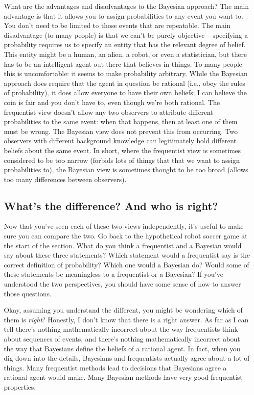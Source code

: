 \documentclass[
]{book}
\begin{document}
What are the advantages and disadvantages to the Bayesian approach? The main advantage is that it allows you to assign probabilities to any event you want to. You don't need to be limited to those events that are repeatable. The main disadvantage (to many people) is that we can't be purely objective -- specifying a probability requires us to specify an entity that has the relevant degree of belief. This entity might be a human, an alien, a robot, or even a statistician, but there has to be an intelligent agent out there that believes in things. To many people this is uncomfortable: it seems to make probability arbitrary. While the Bayesian approach does require that the agent in question be rational (i.e., obey the rules of probability), it does allow everyone to have their own beliefs; I can believe the coin is fair and you don't have to, even though we're both rational. The frequentist view doesn't allow any two observers to attribute different probabilities to the same event: when that happens, then at least one of them must be wrong. The Bayesian view does not prevent this from occurring. Two observers with different background knowledge can legitimately hold different beliefs about the same event. In short, where the frequentist view is sometimes considered to be too narrow (forbids lots of things that that we want to assign probabilities to), the Bayesian view is sometimes thought to be too broad (allows too many differences between observers).

\hypertarget{whats-the-difference-and-who-is-right}{%
\subsection{What's the difference? And who is right?}\label{whats-the-difference-and-who-is-right}}

Now that you've seen each of these two views independently, it's useful to make sure you can compare the two. Go back to the hypothetical robot soccer game at the start of the section. What do you think a frequentist and a Bayesian would say about these three statements? Which statement would a frequentist say is the correct definition of probability? Which one would a Bayesian do? Would some of these statements be meaningless to a frequentist or a Bayesian? If you've understood the two perspectives, you should have some sense of how to answer those questions.

Okay, assuming you understand the different, you might be wondering which of them is \emph{right}? Honestly, I don't know that there is a right answer. As far as I can tell there's nothing mathematically incorrect about the way frequentists think about sequences of events, and there's nothing mathematically incorrect about the way that Bayesians define the beliefs of a rational agent. In fact, when you dig down into the details, Bayesians and frequentists actually agree about a lot of things. Many frequentist methods lead to decisions that Bayesians agree a rational agent would make. Many Bayesian methods have very good frequentist properties.
\end{document}

